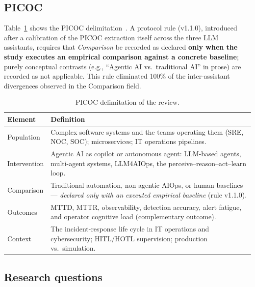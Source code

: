 \documentclass{ieeeaccess}
\begin{document}
\subsection{PICOC}
\label{sec:picoc}

Table~\ref{tab:picoc} shows the PICOC delimitation~\cite{petticrew2006}.
A protocol rule (v1.1.0), introduced after a calibration of the PICOC
extraction itself across the three LLM assistants, requires that \emph{Comparison} be recorded
as declared \textbf{only when the study executes an empirical comparison
against a concrete baseline}; purely conceptual contrasts (e.g.,
``Agentic AI vs.\ traditional AI'' in prose) are recorded as not
applicable. This rule eliminated 100\% of the inter-assistant divergences
observed in the Comparison field.

\begin{table}[!t]
\caption{PICOC delimitation of the review.}
\label{tab:picoc}
\centering
\begin{tabular}{@{}p{}p{}@{}}
\toprule
\textbf{Element} & \textbf{Definition} \\
\midrule
Population & Complex software systems and the teams operating them
(SRE, NOC, SOC); microservices; IT operations pipelines. \\
Intervention & Agentic AI as copilot or autonomous agent:
LLM-based agents, multi-agent systems, LLM4AIOps, the
perceive--reason--act--learn loop. \\
Comparison & Traditional automation, non-agentic AIOps, or human
baselines --- \emph{declared only with an executed empirical baseline}
(rule v1.1.0). \\
Outcomes & MTTD, MTTR, observability, detection accuracy,
alert fatigue, and operator cognitive load (complementary outcome). \\
Context & The incident-response life cycle in IT operations and
cybersecurity; HITL/HOTL supervision; production vs.\ simulation. \\
\bottomrule
\end{tabular}
\end{table}

\subsection{Research questions}
\label{sec:rqs}
\end{document}
